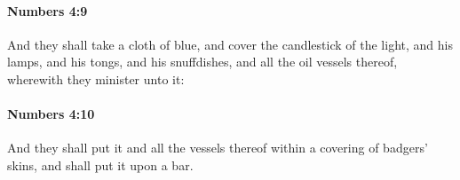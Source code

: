 		\paragraph{Numbers 4:9} %
			\label{NUMBERS-4-9}

			And they shall take a cloth of blue, and cover the candlestick of the light, and his lamps, and his tongs, and his snuffdishes, and all the oil vessels thereof, wherewith they minister unto it:


		\paragraph{Numbers 4:10} %
			\label{NUMBERS-4-10}

			And they shall put it and all the vessels thereof within a covering of badgers’ skins, and shall put it upon a bar.


